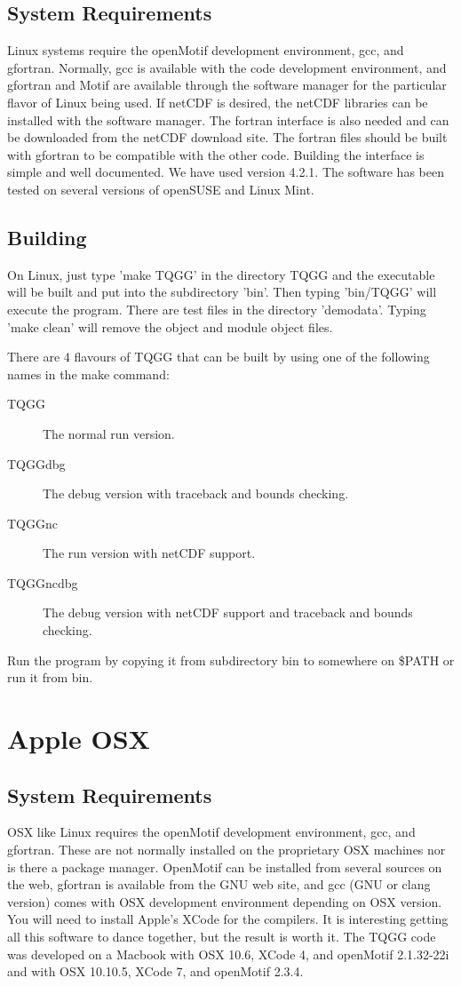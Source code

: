 \documentclass[10pt]{article}
\begin{document}
\subsection{System Requirements}
Linux systems require the openMotif development environment, gcc, and gfortran. Normally, gcc is 
available with the code development environment, and gfortran and Motif are available through
the software manager for the particular flavor of Linux being used. If netCDF is desired, the netCDF 
libraries can be installed with the software manager. The fortran interface is also needed and can be 
downloaded from the netCDF download site. The fortran files should be built with gfortran to be compatible
with the other code. Building the interface is simple and well documented. We have used version 4.2.1.
The software has been
tested on several versions of openSUSE and Linux Mint. 

\subsection{Building}
On Linux, just type 'make TQGG' in the directory TQGG and the executable will be built and put into the
subdirectory 'bin'. Then typing 'bin/TQGG' will execute the program. There are test files in 
the directory 'demodata'. Typing 'make clean' will remove the object and module object files.

There are 4 flavours of TQGG that can be built by using one of the following names in the make command:
\begin{description}
 \item [TQGG] The normal run version.
 \item [TQGGdbg] The debug version with traceback and bounds checking.
 \item [TQGGnc] The run version with netCDF support.
 \item [TQGGncdbg] The debug version with netCDF support and traceback and bounds checking.
\end{description}

Run the program by copying it from subdirectory bin to somewhere on \$PATH or run it from bin. 

\section{Apple OSX}
\subsection{System Requirements}
OSX like Linux requires the openMotif development environment, gcc, and gfortran. These are
not normally installed on the proprietary OSX machines nor is there a package manager. 
OpenMotif can be installed from several
sources on the web, gfortran is available from the GNU web site, and gcc (GNU or clang version) 
comes with OSX development environment depending on OSX version. You will need to install
Apple's XCode for the compilers. It is interesting getting all this software to dance together,
but the result is worth it. The TQGG code was developed on a Macbook with OSX 10.6,
XCode 4, and openMotif 2.1.32-22i and with OSX 10.10.5, XCode 7, and openMotif 2.3.4.
\end{document}

